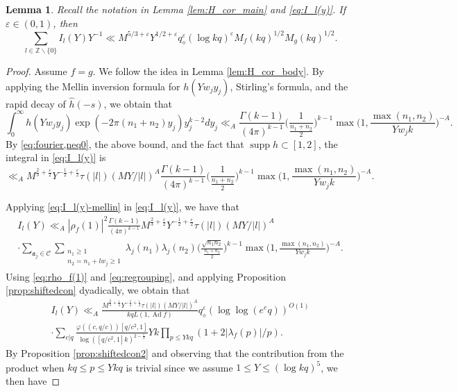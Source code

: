 \documentclass[12pt,reqno]{amsart}
\newtheorem{lem}[thm]{Lemma}
\theoremstyle{remark}
\DeclareMathOperator{\ad}{Ad}
\DeclareMathOperator{\supp}{supp}
\numberwithin{equation}{section}
\begin{document}
        \begin{lem} 
        \label{lem:I_l(Y)}
            Recall the notation in Lemma \ref{lem:H_cor_main} and  \eqref{eq:I_l(y)}. If $\varepsilon \in (0,1)$, then
            \[
            \sum_{l\in \mathbb{Z}\backslash\{0\}} I_l(Y)Y^{-1} \ll M^{5/3+\varepsilon}Y^{1/2+\varepsilon}q_\diamond^\varepsilon (\log kq)^\varepsilon M_f(kq)^{1/2}M_g(kq)^{1/2}.
            \]
        \end{lem}
        \begin{proof} Assume $f=g$. We follow the idea in Lemma \ref{lem:H_cor_body}. By applying  the Mellin inversion formula for $h(Yw_jy_j)$, Stirling's formula, and the rapid decay of $\widehat{h}(-s)$, we obtain that
	\begin{equation*}
            \int_{0}^{\infty} h(Yw_jy_j) \exp(-2\pi(n_1+n_2)y_j)y_j^{k-2}dy_j
            \ll_{A} \frac{\Gamma(k-1)}{(4\pi)^{k-1}} \Big(\frac{1}{\frac{n_1+n_2}{2}}\Big)^{k-1} \max\Big(1, \frac{\max(n_1,n_2)}{Yw_jk}\Big)^{-A}. 
	\end{equation*}
        By \eqref{eq:fourier,neq0}, the above bound, and the fact that $\supp h \subset [1,2]$, the integral in \eqref{eq:I_l(y)} is
    \begin{equation}\label{eq:I_l(y)-mellin}
    \ll_{A}
        M^{\frac{2}{3}+{\frac{\varepsilon}{2}} }Y^{-\frac{1}{2}+{\frac{\varepsilon}{2}} }\tau(|l|)({MY}/{|l|})^A \frac{\Gamma(k-1)}{(4\pi)^{k-1}} \Big(\frac{1}{\frac{n_1+n_2}{2}}\Big)^{k-1} \max\Big(1, \frac{\max(n_1,n_2)}{Yw_jk}\Big)^{-A}.
    \end{equation} 
	
        Applying \eqref{eq:I_l(y)-mellin}  in \eqref{eq:I_l(y)},  we have that
        \begin{multline}\label{eq:I_l(y)-combined}
			I_l(Y)	\ll_{A} 
            |\rho_f(1)|^2 \frac{\Gamma(k-1)}{(4\pi)^{k-1}}  M^{\frac{2}{3}+{\frac{\varepsilon}{2}} }Y^{-\frac{1}{2}+{\frac{\varepsilon}{2}} }\tau(|l|)(MY/|l|)^A\\ \cdot \sum_{\mathfrak{a}_j \in \mathcal{C}}\sum_{\substack{n_1 \ge 1\\ n_2 = n_1+lw_j \ge 1}} \lambda_j(n_1)\lambda_j(n_2)\Big(\frac{\sqrt{n_1n_2}}{\frac{n_1+n_2}{2}}\Big)^{k-1}\max\Big(1, \frac{\max(n_1,n_2)}{Yw_jk}\Big)^{-A}.
		\end{multline} 
   Using \eqref{eq:rho_f(1)} and \eqref{eq:regrouping}, and applying Proposition \ref{prop:shiftedcon} dyadically, we obtain that
		\begin{multline*}
				I_l(Y) \ll_{A} \frac{M^{\frac{2}{3}+{\frac{\varepsilon}{2}} }Y^{-\frac{1}{2}+{\frac{\varepsilon}{2}} }\tau(|l|)({MY}/{|l|})^A}{kq L(1, \ad f)} q_\diamond^{\varepsilon} (\log\log(e^eq))^{O(1)}\\
				\cdot \sum_{c|q}\frac{\varphi((c,q/c))[q/c^2,1]}{\log([q/c^2,1]k)^{2-{\frac{\varepsilon}{2}} }}Yk \prod_{p \le Ykq}(1+2|\lambda_f(p)|/p).
		\end{multline*}
           By Proposition \ref{prop:shiftedcon2} and observing that the contribution from the product when $kq \le p \le Ykq$ is trivial since we assume $1\le Y \le (\log kq)^5$, we then have
           

\end{proof}
\end{document}
